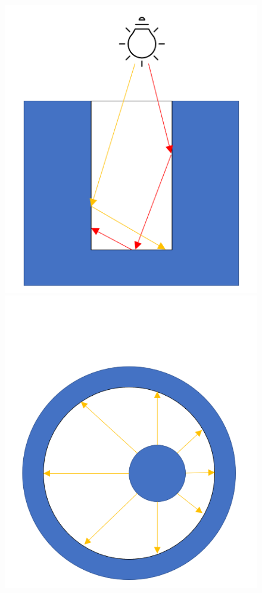 \begin{figure}[!htb]
	\includegraphics[width=\linewidth]{res/trench_with_rays.png}
	\endminipage\hfill
	\includegraphics[width=\linewidth]{res/benchmark_setup.png}

\end{figure}
